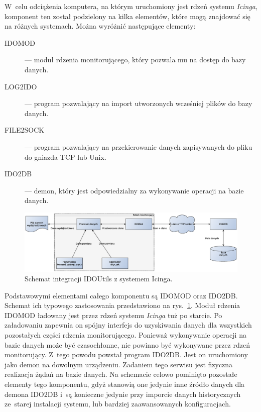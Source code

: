 W~celu odciążenia komputera, na którym uruchomiony jest rdzeń systemu
{\em Icinga}, komponent ten został podzielony na kilka elementów, które mogą
znajdować się na różnych systemach. Można wyróżnić następujące
elementy:

\begin{description}
\item[IDOMOD] --- moduł rdzenia monitorującego, który pozwala mu na dostęp
  do bazy danych.
\item[LOG2IDO] --- program pozwalający na import utworzonych wcześniej
  plików do bazy danych.
\item[FILE2SOCK] --- program pozwalający na przekierowanie danych
  zapisywanych do pliku do gniazda TCP lub Unix.
\item[IDO2DB] --- demon, który jest odpowiedzialny za wykonywanie operacji
  na bazie danych.
\end{description}

\begin{figure}[ht]
  \caption{Schemat integracji IDOUtils z systemem Icinga.}
  \label{fig:IDOUtilsArch}
\includegraphics[width=1\textwidth]{img/idoutilsArch}
\end{figure}

Podstawowymi elementami całego komponentu są IDOMOD oraz
IDO2DB. Schemat ich typowego zastosowania przedstawiono na
rys.~\ref{fig:IDOUtilsArch}. Moduł rdzenia IDOMOD ładowany jest przez
rdzeń systemu {\em Icinga} tuż po starcie. Po załadowaniu zapewnia on spójny
interfejs do uzyskiwania danych dla wszystkich pozostałych części
rdzenia monitorującego. Ponieważ wykonywanie operacji na bazie danych
może być czasochłonne, nie powinno być wykonywane przez rdzeń
monitorujący. Z~tego powodu powstał program IDO2DB. Jest on
uruchomiony jako demon na dowolnym urządzeniu. Zadaniem tego serwisu
jest fizyczna realizacja żądań na bazie danych. Na schemacie celowo
pominięto pozostałe elementy tego komponentu, gdyż stanowią one
jedynie inne źródło danych dla demona IDO2DB i~są konieczne jedynie
przy imporcie danych historycznych ze~starej instalacji systemu, lub
bardziej zaawansowanych konfiguracjach.

